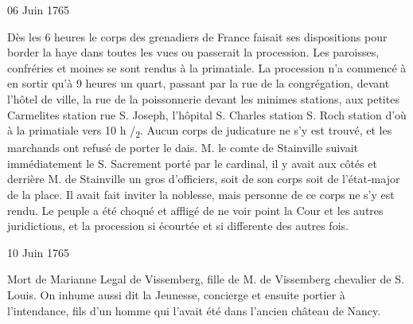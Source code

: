                      \begin{diary}{06 Juin 1765}{}
                        
                         Dès les 6 heures le corps des
                           grenadiers de
                           France faisait ses dispositions pour border la
                           haye dans toutes les vues ou passerait la
                           procession. Les paroisses, confréries et moines
                           se sont rendus à la
                              primatiale. La procession
                           n'a commencé à en sortir qu'à 9 heures un
                           quart, passant par la rue
                              de la congrégation,
                           devant l'hôtel de ville,
                              la rue de la
                              poissonnerie
                           devant les minimes
                              stations, aux
                              petites Carmelites
                              station rue S. Joseph, l'hôpital S. Charles station
                           S. Roch station d'où à la
                              primatiale vers 10 h /\textsubscript{2}.
                           Aucun corps de judicature
                           ne s'y est trouvé,
                           et les marchands ont refusé de porter le dais.
                           M. le comte de Stainville
                           suivait immédiatement
                           le S. Sacrement porté par le cardinal, il y
                           avait
                           aux côtés et derrière M. de
                              Stainville un gros
                           d'officiers, soit de son corps soit de l’état-major
                           de la place. Il avait fait inviter la noblesse,
                           mais personne de ce corps ne s'y est rendu.
                           Le peuple a été choqué et affligé de ne voir
                           point la Cour et les autres juridictions, et la procession si écourtée et si
                           differente des
                           autres fois. \bigskip
        
        
                     \end{diary}
                     \begin{diary}{10 Juin 1765}{}
                        
                         Mort de Marianne Legal de Vissemberg,
                           fille de M. de Vissemberg
                           chevalier de S. Louis.
                           On inhume aussi 
                           dit la Jeunesse, concierge et
                           ensuite portier
                           à l'intendance, fils d'un homme
                           qui l'avait
                           été dans l'ancien château de Nancy. \bigskip
        
        
                     \end{diary}
